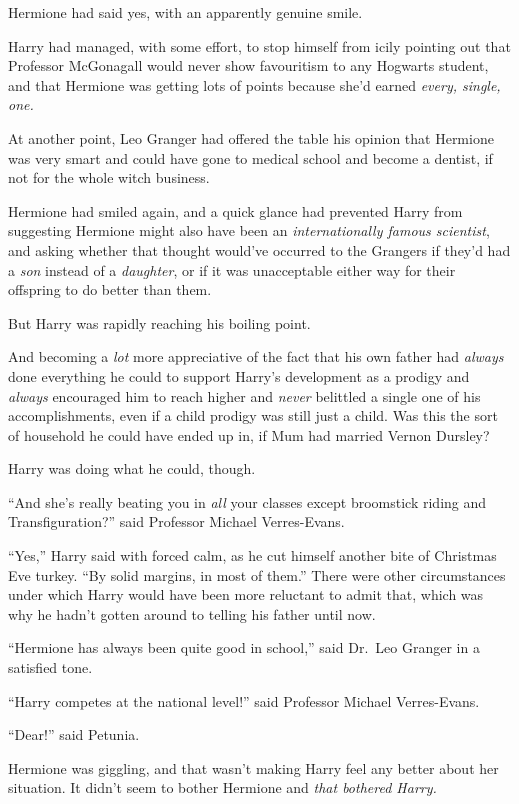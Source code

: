 Hermione had said yes, with an apparently genuine smile.

Harry had managed, with some effort, to stop himself from icily pointing
out that Professor McGonagall would never show favouritism to any
Hogwarts student, and that Hermione was getting lots of points because
she'd earned \emph{every, single, one.}

At another point, Leo Granger had offered the table his opinion that
Hermione was very smart and could have gone to medical school and become
a dentist, if not for the whole witch business.

Hermione had smiled again, and a quick glance had prevented Harry from
suggesting Hermione might also have been an \emph{internationally famous
scientist}, and asking whether that thought would've occurred to the
Grangers if they'd had a \emph{son} instead of a \emph{daughter}, or if
it was unacceptable either way for their offspring to do better than
them.

But Harry was rapidly reaching his boiling point.

And becoming a \emph{lot} more appreciative of the fact that his own
father had \emph{always} done everything he could to support Harry's
development as a prodigy and \emph{always} encouraged him to reach
higher and \emph{never} belittled a single one of his accomplishments,
even if a child prodigy was still just a child. Was this the sort of
household he could have ended up in, if Mum had married Vernon Dursley?

Harry was doing what he could, though.

``And she's really beating you in \emph{all} your classes except
broomstick riding and Transfiguration?'' said Professor Michael
Verres-Evans.

``Yes,'' Harry said with forced calm, as he cut himself another bite of
Christmas Eve turkey. ``By solid margins, in most of them.'' There were
other circumstances under which Harry would have been more reluctant to
admit that, which was why he hadn't gotten around to telling his father
until now.

``Hermione has always been quite good in school,'' said Dr.~Leo Granger
in a satisfied tone.

``Harry competes at the national level!'' said Professor Michael
Verres-Evans.

``Dear!'' said Petunia.

Hermione was giggling, and that wasn't making Harry feel any better
about her situation. It didn't seem to bother Hermione and \emph{that
bothered Harry.}

